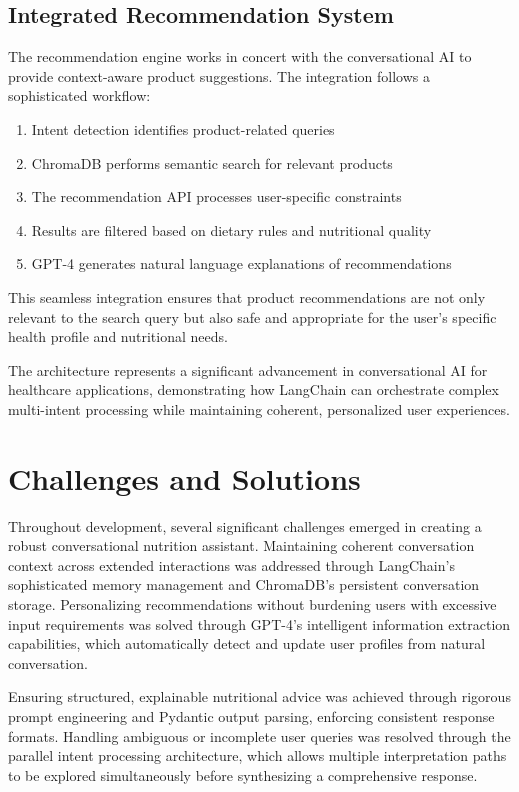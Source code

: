 \subsection{Integrated Recommendation System}
The recommendation engine works in concert with the conversational AI to provide context-aware product suggestions. The integration follows a sophisticated workflow:
\begin{enumerate}
\item Intent detection identifies product-related queries
\item ChromaDB performs semantic search for relevant products
\item The recommendation API processes user-specific constraints
\item Results are filtered based on dietary rules and nutritional quality
\item GPT-4 generates natural language explanations of recommendations
\end{enumerate}

This seamless integration ensures that product recommendations are not only relevant to the search query but also safe and appropriate for the user's specific health profile and nutritional needs.

The architecture represents a significant advancement in conversational AI for healthcare applications, demonstrating how LangChain can orchestrate complex multi-intent processing while maintaining coherent, personalized user experiences.

\section{Challenges and Solutions}
Throughout development, several significant challenges emerged in creating a robust conversational nutrition assistant. Maintaining coherent conversation context across extended interactions was addressed through LangChain's sophisticated memory management and ChromaDB's persistent conversation storage. Personalizing recommendations without burdening users with excessive input requirements was solved through GPT-4's intelligent information extraction capabilities, which automatically detect and update user profiles from natural conversation.

Ensuring structured, explainable nutritional advice was achieved through rigorous prompt engineering and Pydantic output parsing, enforcing consistent response formats. Handling ambiguous or incomplete user queries was resolved through the parallel intent processing architecture, which allows multiple interpretation paths to be explored simultaneously before synthesizing a comprehensive response.


